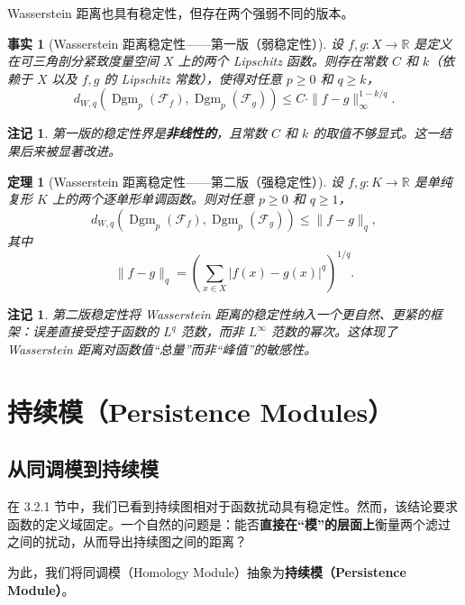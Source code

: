 \documentclass[UTF8]{ctexart}
\newtheorem{remark}[definition]{注记}
\newtheorem{fact}[definition]{事实}
\newtheorem{theorem}[definition]{定理}
\begin{document}
Wasserstein 距离也具有稳定性，但存在两个强弱不同的版本。

\begin{fact}[Wasserstein 距离稳定性——第一版（弱稳定性）]
\label{fact:wasserstein-weak}
设 \(f, g: X \to \mathbb{R}\) 是定义在可三角剖分紧致度量空间 \(X\) 上的两个 Lipschitz 函数。则存在常数 \(C\) 和 \(k\)（依赖于 \(X\) 以及 \(f,g\) 的 Lipschitz 常数），使得对任意 \(p \ge 0\) 和 \(q \ge k\)，
\[
d_{W,q}(\operatorname{Dgm}_p(\mathcal{F}_f), \operatorname{Dgm}_p(\mathcal{F}_g))
\le C \cdot \|f - g\|_\infty^{1 - k/q}.
\]
\end{fact}

\begin{remark}
第一版的稳定性界是\textbf{非线性的}，且常数 \(C\) 和 \(k\) 的取值不够显式。这一结果后来被显著改进。
\end{remark}

\begin{theorem}[Wasserstein 距离稳定性——第二版（强稳定性）]
\label{thm:wasserstein-strong}
设 \(f, g: K \to \mathbb{R}\) 是单纯复形 \(K\) 上的两个逐单形单调函数。则对任意 \(p \ge 0\) 和 \(q \ge 1\)，
\[
d_{W,q}(\operatorname{Dgm}_p(\mathcal{F}_f), \operatorname{Dgm}_p(\mathcal{F}_g))
\le \|f - g\|_q,
\]
其中
\[
\|f - g\|_q = \left( \sum_{x \in X} |f(x) - g(x)|^q \right)^{1/q}.
\]
\end{theorem}

\begin{remark}
第二版稳定性将 Wasserstein 距离的稳定性纳入一个更自然、更紧的框架：误差直接受控于函数的 \(L^q\) 范数，而非 \(L^\infty\) 范数的幂次。这体现了 Wasserstein 距离对函数值“总量”而非“峰值”的敏感性。
\end{remark}

\section{持续模（Persistence Modules）}
\label{sec:persistence-modules}

\subsection{从同调模到持续模}
\label{subsec:pm-intro}

在 3.2.1 节中，我们已看到持续图相对于函数扰动具有稳定性。然而，该结论要求函数的定义域固定。一个自然的问题是：能否\textbf{直接在“模”的层面上}衡量两个滤过之间的扰动，从而导出持续图之间的距离？

为此，我们将同调模（Homology Module）抽象为\textbf{持续模（Persistence Module）}。
\end{document}
